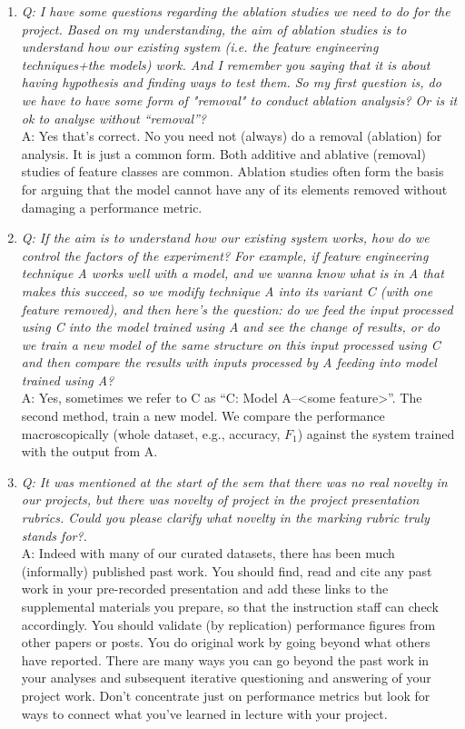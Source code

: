 \documentclass[11pt]{article}
\begin{document}
\begin{enumerate}
    \item {\it Q: I have some questions regarding the ablation studies we need to do for the project.  Based on my understanding, the aim of ablation studies is to understand how our existing system (i.e. the feature engineering techniques+the models) work.  And I remember you saying that it is about having hypothesis and finding ways to test them. 
    So my first question is, do we have to have some form of "removal" to conduct ablation analysis? Or is it ok to analyse without ``removal''?}\\
    A: Yes that's correct.  No you need not (always) do a removal (ablation) for analysis. It is just a common form. Both additive and ablative (removal) studies of feature classes are common.  Ablation studies often form the basis for arguing that the model cannot have any of its elements removed without damaging a performance metric.

    \item {\it Q: If the aim is to understand how our existing system works, how do we control the factors of the experiment? For example, if feature engineering technique A works well with a model, and we wanna know what is in A that makes this succeed, so we modify technique A into its variant C (with one feature removed), and then here's the question:  do we feed the input processed using C into the model trained using A and see the change of results, or do we train a new model of the same structure on this input processed using C and then compare the results with inputs processed by A feeding into model trained using A?}\\
    A: Yes, sometimes we refer to C as ``C: Model A–<some feature>''. The second method, train a new model.  We compare the performance macroscopically (whole dataset, e.g., accuracy, $F_1$) against the system trained with the output from A.

    \item {\it Q: It was mentioned at the start of the sem that there was no real novelty in our projects, but there was novelty of project in the project presentation rubrics. Could you please clarify what novelty in the marking rubric truly stands for?.}\\
    A: Indeed with many of our curated datasets, there has been much (informally) published past work.  You should find, read and cite any past work in your pre-recorded presentation and add these links to the supplemental materials you prepare, so that the instruction staff can check accordingly. You should validate (by replication) performance figures from other papers or posts. You do original work by going beyond what others have reported.  There are many ways you can go beyond the past work in your analyses and subsequent iterative questioning and answering of your project work.  Don't concentrate just on performance metrics but look for ways to connect what you've learned in lecture with your project.


\end{enumerate}
\end{document}
